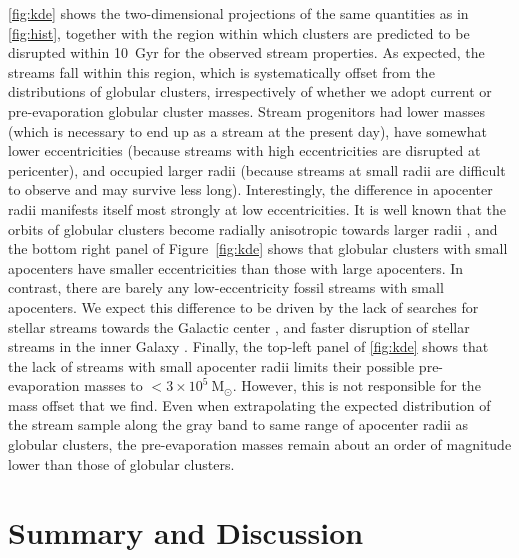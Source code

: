 \documentclass[twocolumn]{aastex63}
\newcommand{\msun}{\ensuremath{\textrm{M}_\odot}}
\begin{document}
\autoref{fig:kde} shows the two-dimensional projections of the same quantities as in \autoref{fig:hist}, together with the region within which clusters are predicted to be disrupted within 10~Gyr for the observed stream properties.
As expected, the streams fall within this region, which is systematically offset from the distributions of globular clusters, irrespectively of whether we adopt current or pre-evaporation globular cluster masses.
Stream progenitors had lower masses (which is necessary to end up as a stream at the present day), have somewhat lower eccentricities (because streams with high eccentricities are disrupted at pericenter), and occupied larger radii (because streams at small radii are difficult to observe and may survive less long).
Interestingly, the difference in apocenter radii manifests itself most strongly at low eccentricities.
It is well known that the orbits of globular clusters become radially anisotropic towards larger radii \citep[e.g.][]{dinescu99}, and the bottom right panel of Figure~\ref{fig:kde} shows that globular clusters with small apocenters have smaller eccentricities than those with large apocenters.
In contrast, there are barely any low-eccentricity fossil streams with small apocenters.
We expect this difference to be driven by the lack of searches for stellar streams towards the Galactic center \citep[e.g.,][]{malhan:2018, ibata:2019}, and faster disruption of stellar streams in the inner Galaxy \citep[e.g., due to enhanced dispersal caused by the rotating bar,][]{price-whelan:2016, hattori:2016}.
Finally, the top-left panel of \autoref{fig:kde} shows that the lack of streams with small apocenter radii limits their possible pre-evaporation masses to $<3\times10^5~\msun$. However, this is not responsible for the mass offset that we find. Even when extrapolating the expected distribution of the stream sample along the gray band to same range of apocenter radii as globular clusters, the pre-evaporation masses remain about an order of magnitude lower than those of globular clusters.


\section{Summary and Discussion}
\label{sec:discussion}
\end{document}
